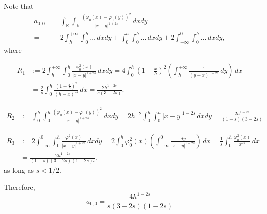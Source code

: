 \documentclass[10 pt]{article}
\numberwithin{equation}{section}
\newcommand{\RR}{\mathbb{R}}
\begin{document}
Note that
	\begin{align*}
	a_{0,0}= & \int_{\RR}\int_{\RR}\frac{(\varphi_0(x)-\varphi_0(y))^2}{|x-y|^{1+2s}}\,dxdy
	\\
	=& 2\int_{h}^{+\infty}\int_{0}^{h} \ldots\,dxdy  + \int_{0}^{h}\int_{0}^{h} \ldots\,dxdy + 2\int_{-\infty}^{0}\int_{0}^{h} \ldots\,dxdy,
\end{align*}
where 

\begin{align*}
	R_1 &:= 2\int_{h}^{+\infty}\int_{0}^{h} \frac{\varphi_0^2(x)}{|x-y|^{1+2s}}\,dxdy = 4\int_{0}^{h}\left(1-\frac{x}{h}\right)^2\left(\int_{h}^{+\infty} \frac{1}{(y-x)^{1+2s}}\, dy\right)\,dx \\
	&= \frac{2}{s}\int_{0}^{h}\frac{\left(1-\frac{x}{h}\right)^2}{(h-x)^{2s}}\,dx
	=\frac{2h^{1-2 s}}{s(3-2 s)}.
\end{align*}

\begin{align*}
	R_2 &
	:= \int_{0}^{h}\int_{0}^{h} \frac{(\varphi_0(x)-\varphi_0(y))^2}{|x-y|^{1+2s}}\,dxdy
	= 2h^{-2}\int_{0}^{h}\int_{0}^{h} |x-y|^{1-2s}\,dxdy
	=\frac{2h^{1-2 s}}{(1-s) (3-2 s)}
\end{align*}



\begin{align*}
	R_3 &:= 2\int_{-\infty}^{0}\int_{0}^{h} \frac{\varphi_0^2(x)}{|x-y|^{1+2s}}\,dxdy = 2\int_{0}^{h}\varphi_0^2(x)\left(\int_{-\infty}^{0} \frac{dy}{|x-y|^{1+2s}}\right)\,dx = \frac{1}{s}\int_{0}^{h}\frac{\varphi_0^2(x)}{x^{2s}}\,dx\\
	&=\frac{2h^{1-2 s}}{(1-s)(3-2 s) (1-2 s)s}.
\end{align*}
%
as long as $s<1/2$.

Therefore,
%
\begin{equation*}
    a_{0,0}=\frac{4h^{1 - 2 s}}{s (3 - 2 s) (1 - 2 s)}
\end{equation*}
%
\end{document}
